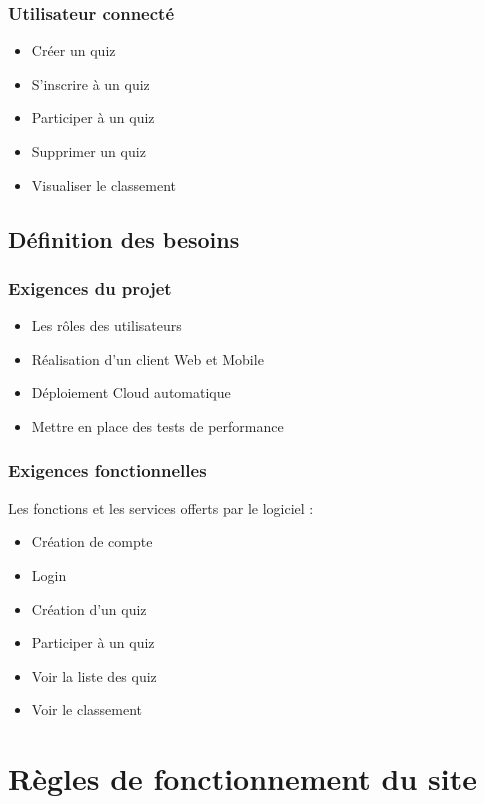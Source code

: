 \documentclass[a4paper, 12pt]{article}
\begin{document}
\subsubsection{Utilisateur connecté}
\begin{itemize}
    \item Créer un quiz
    \item S'inscrire à un quiz
    \item Participer à un quiz
    \item Supprimer un quiz
    \item Visualiser le classement
\end{itemize}
\subsection{Définition des besoins}
\subsubsection{Exigences du projet}
\begin{itemize}
    \item Les rôles des utilisateurs
    \item Réalisation d'un client Web et Mobile
    \item Déploiement Cloud automatique
    \item Mettre en place des tests de performance
\end{itemize}
\subsubsection{Exigences fonctionnelles}
Les fonctions et les services offerts par le logiciel :
\begin{itemize}
    \item Création de compte
    \item Login
    \item Création d'un quiz
    \item Participer à un quiz
    \item Voir la liste des quiz
    \item Voir le classement
\end{itemize}

\newpage
\section{Règles de fonctionnement du site}
\end{document}
